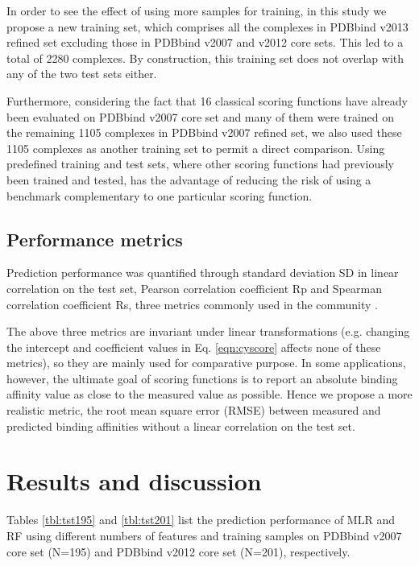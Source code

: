 \documentclass[10pt,conference,compsocconf]{IEEEtran}
\begin{document}
In order to see the effect of using more samples for training, in this study we propose a new training set, which comprises all the complexes in PDBbind v2013 refined set excluding those in PDBbind v2007 and v2012 core sets. This led to a total of 2280 complexes. By construction, this training set does not overlap with any of the two test sets either.

Furthermore, considering the fact that 16 classical scoring functions have already been evaluated \cite{1313} on PDBbind v2007 core set and many of them were trained on the remaining 1105 complexes in PDBbind v2007 refined set, we also used these 1105 complexes as another training set to permit a direct comparison. Using predefined training and test sets, where other scoring functions had previously been trained and tested, has the advantage of reducing the risk of using a benchmark complementary to one particular scoring function.

\subsection{Performance metrics}

Prediction performance was quantified through standard deviation SD in linear correlation on the test set, Pearson correlation coefficient Rp and Spearman correlation coefficient Rs, three metrics commonly used in the community \cite{1313}.

The above three metrics are invariant under linear transformations (e.g. changing the intercept and coefficient values in Eq. \ref{eqn:cyscore} affects none of these metrics), so they are mainly used for comparative purpose. In some applications, however, the ultimate goal of scoring functions is to report an absolute binding affinity value as close to the measured value as possible. Hence we propose a more realistic metric, the root mean square error (RMSE) between measured and predicted binding affinities without a linear correlation on the test set.

\section{Results and discussion}

Tables \ref{tbl:tst195} and \ref{tbl:tst201} list the prediction performance of MLR and RF using different numbers of features and training samples on PDBbind v2007 core set (N=195) and PDBbind v2012 core set (N=201), respectively.
\end{document}
